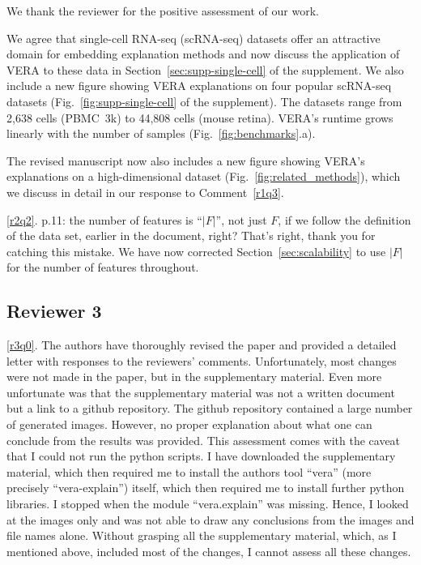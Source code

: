 \documentclass[11pt]{article}
\newcounter{rtaskno}
\newcommand{\rtask}[1]{\refstepcounter{rtaskno}\label{#1}}
\newcommand{\reviewc}[2]{\begin{leftbar}\noindent\rtask{#1}\ref{#1}. #2\end{leftbar}\vspace*{-4mm}}
\newcommand{\answer}[1]{\noindent #1\par\vspace{2mm}}
\newlength{\leftbarwidth}
\newlength{\leftbarsep}
\renewenvironment{leftbar}{%
    \def\FrameCommand{{\color{black}{\vrule width \leftbarwidth\relax\hspace {\leftbarsep}}}}%
    \MakeFramed {\advance \hsize -\width \FrameRestore }%
}{\endMakeFramed}
\begin{document}
\answer{%
We thank the reviewer for the positive assessment of our work.

We agree that single-cell RNA-seq (scRNA-seq) datasets offer an attractive domain for embedding explanation methods and now discuss the application of VERA to these data in Section~\ref{sec:supp-single-cell} of the supplement. We also include a new figure showing VERA explanations on four popular scRNA-seq datasets (Fig.~\ref{fig:supp-single-cell} of the supplement). The datasets range from 2,638 cells (PBMC~3k) to 44,808 cells (mouse retina). VERA's runtime grows linearly with the number of samples (Fig.~\ref{fig:benchmarks}.a).

The revised manuscript now also includes a new figure showing VERA's explanations on a high-dimensional dataset (Fig.~\ref{fig:related_methods}), which we discuss in detail in our response to Comment~\ref{r1q3}.
}

\reviewc{r2q2}{p.11: the number of features is ``$|F|$'', not just $F$, if we follow the definition of the data set, earlier in the document, right?}
\answer{That's right, thank you for catching this mistake. We have now corrected Section~\ref{sec:scalability} to use $|F|$ for the number of features throughout.}

\subsection*{Reviewer 3}

\reviewc{r3q0}{The authors have thoroughly revised the paper and provided a detailed letter with responses to the reviewers' comments. Unfortunately, most changes were not made in the paper, but in the supplementary material. Even more unfortunate was that the supplementary material was not a written document but a link to a github repository. The github repository contained a large number of generated images. However, no proper explanation about what one can conclude from the results was provided. This assessment comes with the caveat that I could not run the python scripts. I have downloaded the supplementary material, which then required me to install the authors tool ``vera'' (more precisely ``vera-explain'') itself, which then required me to install further python libraries. I stopped when the module ``vera.explain'' was missing. Hence, I looked at the images only and was not able to draw any conclusions from the images and file names alone. Without grasping all the supplementary material, which, as I mentioned above, included most of the changes, I cannot assess all these changes.}
\end{document}
